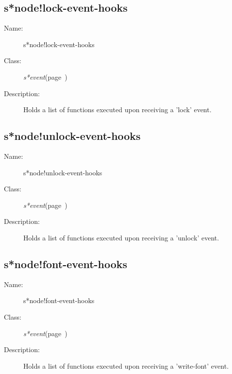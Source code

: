 \subsection{s*node!lock-event-hooks}
\label{s*node!lock-event-hooks}

\begin{description}

\item [Name:]  s*node!lock-event-hooks


\item [Class:]
{\sl s*event}\hfill(page~\pageref{s*event})


\item [Description:]
Holds a list of functions executed upon
receiving a 'lock' event.


\end{description}
\horizontalline

\subsection{s*node!unlock-event-hooks}
\label{s*node!unlock-event-hooks}

\begin{description}
\item [Name:]  s*node!unlock-event-hooks

\item [Class:]
{\sl s*event}\hfill(page~\pageref{s*event})

\item [Description:]
Holds a list of functions executed upon
receiving a 'unlock' event.


\end{description}
\horizontalline

\subsection{s*node!font-event-hooks}
\label{s*node!font-event-hooks}

\begin{description}
\item [Name:]  s*node!font-event-hooks

\item [Class:]
{\sl s*event}\hfill(page~\pageref{s*event})

\item [Description:]
Holds a list of functions executed upon receiving
a 'write-font' event.


\end{description}
\horizontalline

